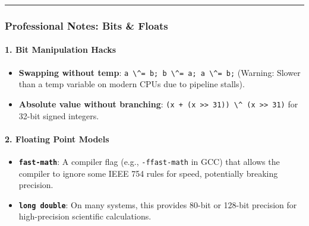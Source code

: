 \begin{center}\rule{0.5\linewidth}{0.5pt}\end{center}

\hypertarget{professional-notes-bits-floats}{%
\subsubsection{Professional Notes: Bits \&
Floats}\label{professional-notes-bits-floats}}

\hypertarget{bit-manipulation-hacks}{%
\paragraph{1. Bit Manipulation Hacks}\label{bit-manipulation-hacks}}

\begin{itemize}
\tightlist
\item
  \textbf{Swapping without temp}:
  \passthrough{\lstinline!a \^= b; b \^= a; a \^= b;!} (Warning: Slower
  than a temp variable on modern CPUs due to pipeline stalls).
\item
  \textbf{Absolute value without branching}:
  \passthrough{\lstinline!(x + (x >> 31)) \^ (x >> 31)!} for 32-bit
  signed integers.
\end{itemize}

\hypertarget{floating-point-models}{%
\paragraph{2. Floating Point Models}\label{floating-point-models}}

\begin{itemize}
\tightlist
\item
  \textbf{\passthrough{\lstinline!fast-math!}}: A compiler flag (e.g.,
  \passthrough{\lstinline!-ffast-math!} in GCC) that allows the compiler
  to ignore some IEEE 754 rules for speed, potentially breaking
  precision.
\item
  \textbf{\passthrough{\lstinline!long double!}}: On many systems, this
  provides 80-bit or 128-bit precision for high-precision scientific
  calculations.
\end{itemize}
